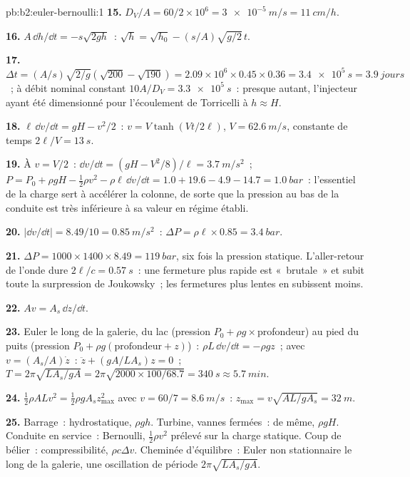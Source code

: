 \begin{solution}{pb:b2:euler-bernoulli:1}
\textbf{15.} $D_V/A = 60/2 \times 10^6 = \qty{3e-5}{m/s} = \qty{11}{cm/h}$.

\textbf{16.} $A\,\dd h/\dd t = -s\sqrt{2gh}$~: $\sqrt h = \sqrt{h_0} - (s/A)\sqrt{g/2}\,t$.

\textbf{17.} $\Delta t = (A/s)\sqrt{2/g}(\sqrt{200} - \sqrt{190}) = 2.09 \times 10^6 \times
0.45 \times 0.36 = \qty{3.4e5}{s} = \qty{3.9}{jours}$~; à débit nominal constant
$10A/D_V = \qty{3.3e5}{s}$~: presque autant, l'injecteur ayant été dimensionné
pour l'écoulement de Torricelli à $h \approx H$.

\textbf{18.} $\ell\,\dd v/\dd t = gH - v^2/2$~: $v = V\tanh(Vt/2\ell)$, $V = \qty{62.6}{m/s}$,
constante de temps $2\ell/V = \qty{13}{s}$.

\textbf{19.} À $v = V/2$~: $\dd v/\dd t = (gH - V^2/8)/\ell = \qty{3.7}{m/s^2}$~;
$P = P_0 + \rho gH - \tfrac12\rho v^2 - \rho\ell\,\dd v/\dd t = 1.0 + 19.6 - 4.9 - 14.7
= \qty{1.0}{bar}$~: l'essentiel de la charge sert à accélérer la colonne, de sorte que
la pression au bas de la conduite est très inférieure à sa valeur en régime établi.

\textbf{20.} $|\dd v/\dd t| = 8.49/10 = \qty{0.85}{m/s^2}$~: $\Delta P = \rho\ell \times 0.85 =
\qty{3.4}{bar}$.

\textbf{21.} $\Delta P = 1000 \times 1400 \times 8.49 = \qty{119}{bar}$, six fois la
pression statique. L'aller-retour de l'onde dure $2\ell/c = \qty{0.57}{s}$~: une
fermeture plus rapide est «~brutale~» et subit toute la surpression de
Joukowsky~; les fermetures plus lentes en subissent moins.

\textbf{22.} $Av = A_s\,\dd z/\dd t$.

\textbf{23.} Euler le long de la galerie, du lac (pression
$P_0 + \rho g\times$profondeur) au pied du puits (pression $P_0 + \rho g
(\text{profondeur} + z)$)~: $\rho L\,\dd v/\dd t = -\rho gz$~; avec $v = (A_s/A)\dot z$~:
$\ddot z + (gA/LA_s)z = 0$~; $T = 2\pi\sqrt{LA_s/gA} = 2\pi\sqrt{2000 \times 100/
68.7} = \qty{340}{s} \approx \qty{5.7}{min}$.

\textbf{24.} $\tfrac12\rho ALv^2 = \tfrac12\rho gA_sz_{\max}^2$ avec $v = 60/7 =
\qty{8.6}{m/s}$~: $z_{\max} = v\sqrt{AL/gA_s} = \qty{32}{m}$.

\textbf{25.} Barrage~: hydrostatique, $\rho gh$. Turbine, vannes fermées~: de
même, $\rho gH$. Conduite en service~: Bernoulli, $\tfrac12\rho v^2$ prélevé
sur la charge statique. Coup de bélier~: compressibilité, $\rho c\Delta v$.
Cheminée d'équilibre~: Euler non stationnaire le long de la galerie, une oscillation de période
$2\pi\sqrt{LA_s/gA}$.
\end{solution}

